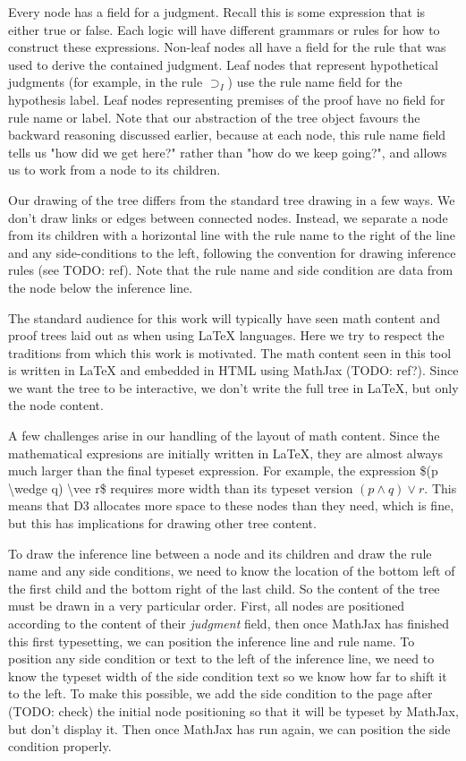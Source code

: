 \documentclass[conference]{IEEEtran}
\begin{document}
Every node has a field for a judgment. Recall this is some expression that is either true or false. Each logic will have different grammars or rules for how to construct these expressions. Non-leaf nodes all have a field for the rule that was used to derive the contained judgment. Leaf nodes that represent hypothetical judgments (for example, in the rule $\supset_I$) use the rule name field for the hypothesis label. Leaf nodes representing premises of the proof have no field for rule name or label. Note that our abstraction of the tree object favours the backward reasoning discussed earlier, because at each node, this rule name field tells us "how did we get here?" rather than "how do we keep going?", and allows us to work from a node to its children.

Our drawing of the tree differs from the standard tree drawing in a few ways. We don't draw links or edges between connected nodes. Instead, we separate a node from its children with a horizontal line with the rule name to the right of the line and any side-conditions to the left, following the convention for drawing inference rules (see TODO: ref). Note that the rule name and side condition are data from the node below the inference line.

The standard audience for this work will typically have seen math content and proof trees laid out as when using \LaTeX{} languages. Here we try to respect the traditions from which this work is motivated. The math content seen in this tool is written in \LaTeX{} and embedded in HTML using MathJax (TODO: ref?). Since we want the tree to be interactive, we don't write the full tree in \LaTeX{}, but only the node content.

A few challenges arise in our handling of the layout of math content. Since the mathematical expresions are initially written in \LaTeX{}, they are almost always much larger than the final typeset expression. For example, the expression \$(p \textbackslash wedge q) \textbackslash vee r\$ requires more width than its typeset version $(p \wedge q) \vee r$. This means that D3 allocates more space to these nodes than they need, which is fine, but this has implications for drawing other tree content.

To draw the inference line between a node and its children and draw the rule name and any side conditions, we need to know the location of the bottom left of the first child and the bottom right of the last child. So the content of the tree must be drawn in a very particular order. First, all nodes are positioned according to the content of their \textit{judgment} field, then once MathJax has finished this first typesetting, we can position the inference line and rule name. To position any side condition or text to the left of the inference line, we need to know the typeset width of the side condition text so we know how far to shift it to the left. To make this possible, we add the side condition to the page after (TODO: check) the initial node positioning so that it will be typeset by MathJax, but don't display it. Then once MathJax has run again, we can position the side condition properly.
\end{document}
